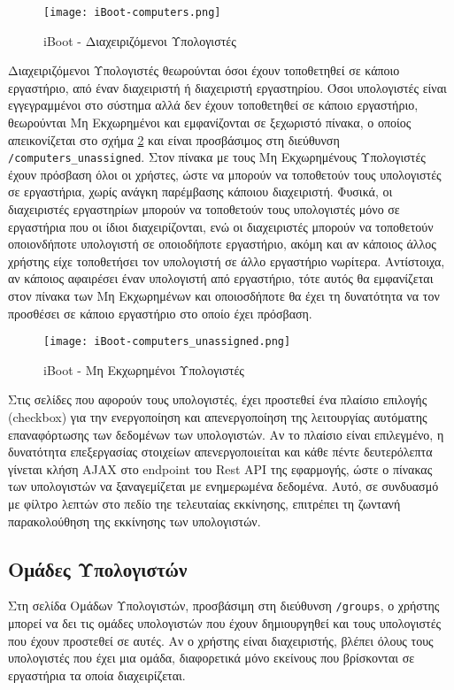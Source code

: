 \begin{figure}[ht]
	\centering
	\texttt{[image: iBoot-computers.png]}
	\caption{iBoot - Διαχειριζόμενοι Υπολογιστές}
	\label{fig:iBoot_computers}
\end{figure}
Διαχειριζόμενοι Υπολογιστές θεωρούνται όσοι έχουν τοποθετηθεί σε κάποιο εργαστήριο, από έναν διαχειριστή ή διαχειριστή εργαστηρίου. Όσοι υπολογιστές είναι εγγεγραμμένοι στο σύστημα αλλά δεν έχουν τοποθετηθεί σε κάποιο εργαστήριο, θεωρούνται Μη Εκχωρημένοι και εμφανίζονται σε ξεχωριστό πίνακα, ο οποίος απεικονίζεται στο σχήμα \ref{fig:iBoot_computers_unassigned} και είναι προσβάσιμος στη διεύθυνση \verb!/computers_unassigned!.
Στον πίνακα με τους Μη Εκχωρημένους Υπολογιστές έχουν πρόσβαση όλοι οι χρήστες, ώστε να μπορούν να τοποθετούν τους υπολογιστές σε εργαστήρια, χωρίς ανάγκη παρέμβασης κάποιου διαχειριστή. Φυσικά, οι διαχειριστές εργαστηρίων μπορούν να τοποθετούν τους υπολογιστές μόνο σε εργαστήρια που οι ίδιοι διαχειρίζονται, ενώ οι διαχειριστές μπορούν να τοποθετούν οποιονδήποτε υπολογιστή σε οποιοδήποτε εργαστήριο, ακόμη και αν κάποιος άλλος χρήστης είχε τοποθετήσει τον υπολογιστή σε άλλο εργαστήριο νωρίτερα. Αντίστοιχα, αν κάποιος αφαιρέσει έναν υπολογιστή από εργαστήριο, τότε αυτός θα εμφανίζεται στον πίνακα των Μη Εκχωρημένων και οποιοσδήποτε θα έχει τη δυνατότητα να τον προσθέσει σε κάποιο εργαστήριο στο οποίο έχει πρόσβαση.

\begin{figure}[ht]
	\centering
	\texttt{[image: iBoot-computers\_unassigned.png]}
	\caption{iBoot - Μη Εκχωρημένοι Υπολογιστές}
	\label{fig:iBoot_computers_unassigned}
\end{figure}
\FloatBarrier

Στις σελίδες που αφορούν τους υπολογιστές, έχει προστεθεί ένα πλαίσιο επιλογής (checkbox) για την ενεργοποίηση και απενεργοποίηση της λειτουργίας αυτόματης επαναφόρτωσης των δεδομένων των υπολογιστών. Αν το πλαίσιο είναι επιλεγμένο, η δυνατότητα επεξεργασίας στοιχείων απενεργοποιείται και κάθε πέντε δευτερόλεπτα γίνεται κλήση AJAX στο endpoint του Rest API της εφαρμογής, ώστε ο πίνακας των υπολογιστών να ξαναγεμίζεται με ενημερωμένα δεδομένα. Αυτό, σε συνδυασμό με φίλτρο λεπτών στο πεδίο τηε τελευταίας εκκίνησης, επιτρέπει τη ζωντανή παρακολούθηση της εκκίνησης των υπολογιστών.

\subsection{Ομάδες Υπολογιστών}
\FloatBarrier
Στη σελίδα Ομάδων Υπολογιστών, προσβάσιμη στη διεύθυνση \verb!/groups!, ο χρήστης μπορεί να δει τις ομάδες υπολογιστών που έχουν δημιουργηθεί και τους υπολογιστές που έχουν προστεθεί σε αυτές. Αν ο χρήστης είναι διαχειριστής, βλέπει όλους τους υπολογιστές που έχει μια ομάδα, διαφορετικά μόνο εκείνους που βρίσκονται σε εργαστήρια τα οποία διαχειρίζεται.

